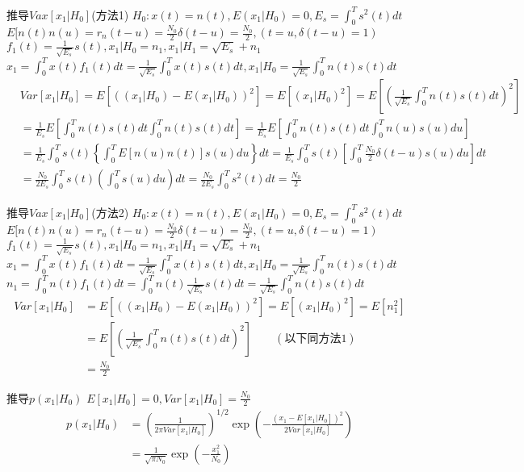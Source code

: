 \begin{frame}{推导$Vax[x_1|H_0]$(方法1)}
$H_0:x(t)=n(t), E(x_1|H_0)=0,E_s=\int_{0}^{T}s^2(t)dt$\\
$E[n(t)n(u)=r_n(t-u)=\frac{N_0}{2}\delta(t-u)=\frac{N_0}{2},(t=u,\delta(t-u)=1)$\\
$f_1(t)=\frac{1}{\sqrt{E_s}}s(t),x_1|H_0=n_1,x_1|H_1=\sqrt{E_s}+n_1$\\ $x_1=\int_{0}^{T}x(t)f_1(t)dt=\frac{1}{\sqrt{E_s}}\int_{0}^{T}x(t)s(t)dt,x_1|H_0=\frac{1}{\sqrt{E_s}}\int_{0}^{T}n(t)s(t)dt$
\begin{align*}
&Var[x_1|H_0]=E[((x_1|H_0)-E(x_1|H_0))^2]=E[(x_1|H_0)^2]=E\left[\left(\frac{1}{\sqrt{E_s}}\int_{0}^{T}n(t)s(t)dt\right)^2\right]\\
&=\frac{1}{E_s}E\left[\int_{0}^{T}n(t)s(t)dt\int_{0}^{T}n(t)s(t)dt\right]=\frac{1}{E_s}E\left[\int_{0}^{T}n(t)s(t)dt\int_{0}^{T}n(u)s(u)du\right]\\
&=\frac{1}{E_s}\int_{0}^{T}s(t)\left\{\int_{0}^{T}E[n(u)n(t)]s(u)du\right\}dt=\frac{1}{E_s}\int_{0}^{T}s(t)\left[\int_{0}^{T}\frac{N_0}{2}\delta(t-u)s(u)du\right]dt\\
&=\frac{N_0}{2E_s}\int_{0}^{T}s(t)\left(\int_{0}^{T}s(u)du\right)dt=\frac{N_0}{2E_s}\int_{0}^{T}s^2(t)dt=\frac{N_0}{2}
\end{align*}
\end{frame}

\begin{frame}{推导$Vax[x_1|H_0]$(方法2)}
$H_0:x(t)=n(t), E(x_1|H_0)=0,E_s=\int_{0}^{T}s^2(t)dt$\\
$E[n(t)n(u)=r_n(t-u)=\frac{N_0}{2}\delta(t-u)=\frac{N_0}{2},(t=u,\delta(t-u)=1)$\\
$f_1(t)=\frac{1}{\sqrt{E_s}}s(t),x_1|H_0=n_1,x_1|H_1=\sqrt{E_s}+n_1$\\ $x_1=\int_{0}^{T}x(t)f_1(t)dt=\frac{1}{\sqrt{E_s}}\int_{0}^{T}x(t)s(t)dt,x_1|H_0=\frac{1}{\sqrt{E_s}}\int_{0}^{T}n(t)s(t)dt$
$n_1=\int_{0}^{T}n(t)f_1(t)dt=\int_{0}^{T}n(t)\frac{1}{\sqrt{E_s}}s(t)dt=\frac{1}{\sqrt{E_s}}\int_{0}^{T}n(t)s(t)dt$
\begin{align*}
Var[x_1|H_0]&=E[((x_1|H_0)-E(x_1|H_0))^2]=E[(x_1|H_0)^2]=E[n_1^2]\\
&=E\left[\left(\frac{1}{\sqrt{E_s}}\int_{0}^{T}n(t)s(t)dt\right)^2\right]\qquad (\text{以下同方法1})\\
&=\frac{N_0}{2}
\end{align*}
\end{frame}

\begin{frame}{推导$p(x_1|H_0)$}
$E[x_1|H_0]=0,Var[x_1|H_0]=\frac{N_0}{2}$
\begin{align*}
p(x_1|H_0)&=\left(\frac{1}{2\pi Var[x_1|H_0]}\right)^{1/2}\exp\left(-\frac{(x_1-E[x_1|H_0])^2}{2Var[x_1|H_0]}\right)\\
&=\frac{1}{\sqrt{\pi N_0}}\exp\left(-\frac{x_1^2}{N_0}\right)
\end{align*}
\end{frame}

